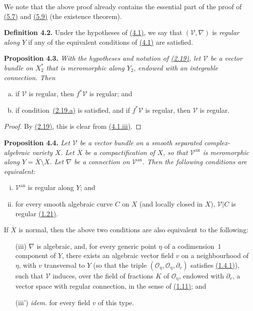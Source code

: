 \documentclass{report}
\newenvironment{itenv}[1]
  {\phantomsection\par\medskip\noindent\textbf{#1.}\itshape}
  {\medskip}
\newenvironment{rmenv}[1]
  {\phantomsection\par\medskip\noindent\textbf{#1.}\rmfamily}
  {\medskip}
\renewcommand{\cal}[1]{{\mathcal{#1}}}
\newcommand{\an}{\mathrm{an}}
\newcommand{\oldpage}[1]{\marginpar{\footnotesize$\Big\vert$ \textit{p.~#1}}}
\begin{document}
We note that the above proof already contains the essential part of the proof of \hyperref[II.5.7]{(5.7)} and \hyperref[II.5.9]{(5.9)} (the existence theorem).

\oldpage{89}
\begin{rmenv}{Definition 4.2}
\label{II.4.2}
  Under the hypotheses of \hyperref[II.4.1]{(4.1)}, we say that $(\cal{V},\nabla)$ is \emph{regular along $Y$} if any of the equivalent conditions of \hyperref[II.4.1]{(4.1)} are satisfied.
\end{rmenv}

\begin{itenv}{Proposition 4.3}
\label{II.4.3}
  With the hypotheses and notation of \hyperref[II.2.19]{(2.19)}, let $\cal{V}$ be a vector bundle on $X_2^*$ that is meromorphic along $Y_2$, endowed with an integrable connection.
  Then
  \begin{enumerate}[(a)]
    \item if $\cal{V}$ is regular, then $f^*\cal{V}$ is regular; and
    \item if condition~\hyperref[II.2.19]{(2.19.a)} is satisfied, and if $f^*\cal{V}$ is regular, then $\cal{V}$ is regular.
  \end{enumerate}
\end{itenv}

\begin{proof}
  By \hyperref[II.2.19]{(2.19)}, this is clear from \hyperref[II.4.1]{(4.1.iii)}.
\end{proof}

\begin{itenv}{Proposition 4.4}
\label{II.4.4}
  Let $\cal{V}$ be a vector bundle on a smooth separated complex-algebraic variety $X$.
  Let $\overline{X}$ be a compactification of $X$, so that $\cal{V}^\an$ is meromorphic along $Y=\overline{X}\setminus X$.
  Let $\nabla$ be a connection on $\cal{V}^\an$.
  Then the following conditions are equivalent:
  \begin{enumerate}[(i)]
    \item $\cal{V}^\an$ is regular along $Y$; and
    \item for every smooth algebraic curve $C$ on $X$ (and locally closed in $X$), $\cal{V}|C$ is regular \hyperref[II.1.21]{(1.21)}.
  \end{enumerate}

  If $\overline{X}$ is normal, then the above two conditions are also equivalent to the following:
  \begin{enumerate}
    \item[(iii)] $\nabla$ is algebraic, and, for every generic point $\eta$ of a codimension~$1$ component of $Y$, there exists an algebraic vector field $v$ on a neighbourhood of $\eta$, with $v$ transversal to $Y$ (so that the triple $(\cal{O}_\eta,\cal{O}_\eta,\partial_v)$ satisfies \hyperref[II.1.4.1]{(1.4.1)}), such that
\oldpage{90}
    $\cal{V}$ induces, over the field of fractions $K$ of $\cal{O}_\eta$, endowed with $\partial_v$, a vector space with regular connection, in the sense of \hyperref[II.1.11]{(1.11)}; and
    \item[(iii')] \emph{idem.} for every field $v$ of this type.
  \end{enumerate}
\end{itenv}
\end{document}
